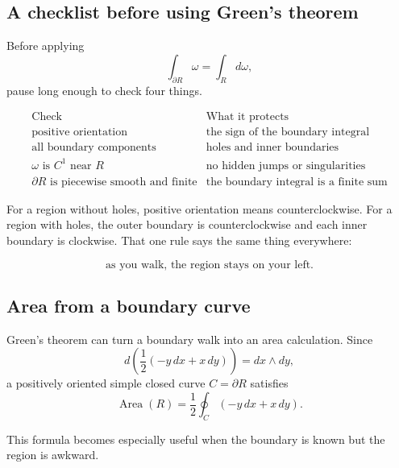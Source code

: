 \subsection{A checklist before using Green's theorem}

Before applying
\[
    \int_{\partial R}\omega=\int_Rd\omega,
\]
pause long enough to check four things.

\[
\begin{array}{c|l}
\text{Check} & \text{What it protects} \\ \hline
\text{positive orientation} & \text{the sign of the boundary integral}\\[1mm]
\text{all boundary components} & \text{holes and inner boundaries}\\[1mm]
\omega \text{ is } C^1 \text{ near } R & \text{no hidden jumps or singularities}\\[1mm]
\partial R \text{ is piecewise smooth and finite} & \text{the boundary integral is a finite sum}
\end{array}
\]

For a region without holes, positive orientation means counterclockwise.  For a region
with holes, the outer boundary is counterclockwise and each inner boundary is
clockwise.  That one rule says the same thing everywhere:

\[
    \text{as you walk, the region stays on your left.}
\]

\subsection{Area from a boundary curve}

Green's theorem can turn a boundary walk into an area calculation.  Since
\[
    d\left(\frac12(-y\,dx+x\,dy)\right)=dx\wedge dy,
\]
a positively oriented simple closed curve \(C=\partial R\) satisfies
\[
\boxed{
    \operatorname{Area}(R)
    =
    \frac12\oint_C(-y\,dx+x\,dy).
}
\]

This formula becomes especially useful when the boundary is known but the region is
awkward.

